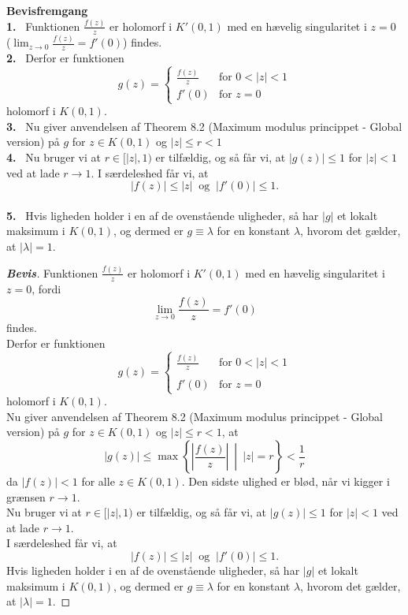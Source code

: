 \documentclass[10pt,a4paper]{article}
\theoremstyle{definition}
\begin{document}
\begin{framed}
\textbf{Bevisfremgang} \\
\textbf{1.} \ Funktionen $\frac{f(z)}{z}$ er holomorf i $K'(0,1)$ med en hævelig singularitet i $z=0$ ($\lim_{z \rightarrow 0} \frac{f(z)}{z} = f'(0)$) findes. \\
\textbf{2.} \ Derfor er funktionen
$$g(z) =
\left\{
	\begin{array}{ll}
		\frac{f(z)}{z} & \text{for } 0 < |z| < 1\\
		f'(0) & \text{for } z=0
	\end{array}
\right.$$
holomorf i $K(0,1)$. \\
\textbf{3.} \ Nu giver anvendelsen af Theorem 8.2 (Maximum modulus princippet - Global version) på $g$ for $z \in K(0,1)$ og $|z| \leq r < 1$ \\
\textbf{4.} \ Nu bruger vi at $r \in [|z|,1)$ er tilfældig, og så får vi, at $|g(z)| \leq 1$ for $|z|<1$ ved at lade $r \rightarrow 1$. I særdeleshed får vi, at 
$$|f(z)| \leq |z| \ \text{ og } \ |f'(0)| \leq 1.$$  \\
\textbf{5.} \  Hvis ligheden holder i en af de ovenstående uligheder, så har $|g|$ et lokalt maksimum i $K(0,1)$, og dermed er $g \equiv \lambda$ for en konstant $\lambda$, hvorom det gælder, at $|\lambda| = 1$.
\end{framed}

\newpage
\begin{proof}[\textbf{Bevis}]
Funktionen $\frac{f(z)}{z}$ er holomorf i $K'(0,1)$ med en hævelig singularitet i $z=0$, fordi
$$\lim_{z \rightarrow 0} \frac{f(z)}{z} = f'(0)$$
findes. \\
Derfor er funktionen
$$g(z) =
\left\{
	\begin{array}{ll}
		\frac{f(z)}{z} & \text{for } 0 < |z| < 1\\ \\
		f'(0) & \text{for } z=0
	\end{array}
\right.$$
holomorf i $K(0,1)$. \\
Nu giver anvendelsen af Theorem 8.2 (Maximum modulus princippet - Global version) på $g$ for $z \in K(0,1)$ og $|z| \leq r < 1$, at
$$|g(z)| \leq \max \left\{ \left| \frac{f(z)}{z} \right| \ \middle| \ |z| =r \right\} < \frac{1}{r}$$
da $|f(z)| <1$ for alle $z\in K(0,1)$. Den sidste ulighed er blød, når vi kigger i grænsen $r \rightarrow 1$.\\
Nu bruger vi at $r \in [|z|,1)$ er tilfældig, og så får vi, at $|g(z)| \leq 1$ for $|z|<1$ ved at lade $r \rightarrow 1$. \\
I særdeleshed får vi, at 
$$|f(z)| \leq |z| \ \text{ og } \ |f'(0)| \leq 1.$$
Hvis ligheden holder i en af de ovenstående uligheder, så har $|g|$ et lokalt maksimum i $K(0,1)$, og dermed er $g \equiv \lambda$ for en konstant $\lambda$, hvorom det gælder, at $|\lambda| = 1$.
\end{proof}
\end{document}
